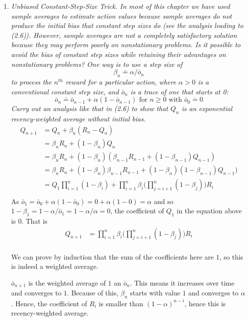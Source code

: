 \documentclass[12pt,a4paper]{article}
\begin{document}
\begin{enumerate}
\item
  \textit{Unbiased Constant-Step-Size Trick. In most of this chapter we have used
  sample averages to estimate action values because sample averages do not produce the
  initial bias that constant step sizes do (see the analysis leading to (2.6)). However, sample
  averages are not a completely satisfactory solution because they may perform poorly
  on nonstationary problems. Is it possible to avoid the bias of constant step sizes while
  retaining their advantages on nonstationary problems? One way is to use a step size of
  \[\beta_n\doteq \alpha / \bar{o}_n\]
  to process the $n^{th}$ reward for a particular action, where $\alpha > 0$ is
  a conventional constant step size, and $\bar{o}_n$ is a trace of one that starts at 0:
  \[\bar{o}_n \doteq \bar{o}_{n - 1} + \alpha(1 - \bar{o}_{n - 1}) \text{ for } n \ge 0 \text{ with } \bar{o}_0 \doteq 0\]
  Carry out an analysis like that in (2.6) to show that $Q_n$ is an exponential recency-weighted
  average without initial bias.
  }
  \begin{align*}
    Q_{n + 1} &= Q_n + \beta_n(R_n - Q_n)\\
    &= \beta_n R_n + (1 - \beta_n)Q_n\\
    &= \beta_n R_n + (1 - \beta_n)(\beta_{n - 1}R_{n - 1} + (1 - \beta_{n - 1}) Q_{n - 1})\\
    &= \beta_n R_n + (1 - \beta_n)\beta_{n - 1}R_{n - 1} + (1 - \beta_n)(1 - \beta_{n - 1}) Q_{n - 1})\\
    &=  Q_1\prod_{i = 1}^n (1 - \beta_i) + \prod_{i = 1} ^n \beta_i \Big(\prod_{j = i + 1}^n (1 - \beta_j)\Big) R_i\\
  \end{align*}
  As $\bar{o}_1 = \bar{o}_0 + \alpha(1 - \bar{o}_0) = 0 + \alpha(1 - 0) = \alpha$ and so
  $1 - \beta_1 = 1 - \alpha/\bar{o}_1 = 1 - \alpha/\alpha = 0$, the coefficient of
  $Q_1$ in the equation above is $0$. That is
    \begin{align*}
    Q_{n + 1} &= \prod_{i = 1} ^n \beta_i \Big(\prod_{j = i + 1}^n (1 - \beta_j)\Big) R_i\\
  \end{align*}

  We can prove by induction that the sum of the coefficients here are $1$, so this is indeed
  a weighted average.

  $\bar{o}_{n + 1}$ is the weighted average of $1$ an $\bar{o}_n.$ This means it increases over time and
  converges to $1$. Because of this, $\beta_n$ starts with value $1$ and converges to $\alpha$.
  Hence, the coefficient of $R_i$ is smaller than $(1 - \alpha)^{n - i}$, hence this is
  recency-weighted average.

\end{enumerate}
\end{document}
